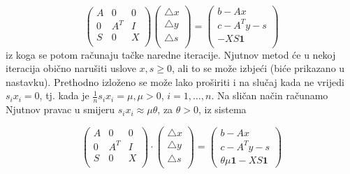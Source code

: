 \documentclass[a4paper, utf8, 11pt, colorlinks]{book}
\begin{document}
\begin{equation}
	\begin{pmatrix}
		A   & 0      &  0      \\
		0   & A^T    &  I      \\
		S   & 0      & X       \\
	\end{pmatrix}  
	\begin{pmatrix} 
		\bigtriangleup  x  \\
		\bigtriangleup  y  \\
		\bigtriangleup  s  \\
	\end{pmatrix} 
	= 
	\begin{pmatrix} 
		b - Ax             \\
		c - A^T y - s      \\
		- X S \textbf{1}  \\                   
	\end{pmatrix} 
\end{equation}
iz koga se potom računaju tačke naredne  iteracije. 
Njutnov metod će u nekoj iteracija obično narušiti uslove $x,s \geq 0$, ali to se može izbjeći (biće prikazano u nastavku).  
Prethodno izloženo se može lako proširiti i na slučaj kada ne vrijedi $s_ix_i = 0$, tj. kada je $\frac{1}{n}s_ix_i = \mu, \mu > 0$, $i=1,\ldots,n$. Na sličan način računamo Njutnov pravac u smijeru $s_i x_i \approx \mu \theta$, za  $\theta >0$, iz sistema 

\begin{equation} \label{eq:newton-interior-system-k}    
	\begin{pmatrix}
		A   & 0      &  0      \\
		0   & A^T    &  I      \\
		S   & 0      & X       \\
	\end{pmatrix} 
	\cdot 
	\begin{pmatrix}
		\bigtriangleup  x  \\
		\bigtriangleup  y  \\
		\bigtriangleup  s  \\
	\end{pmatrix} 
	=
	\begin{pmatrix}
		b - Ax           \\
		c - A^T y - s      \\
		\theta \mu \mathbf{1} - X S \textbf{1}                      
	\end{pmatrix}
\end{equation}
\end{document}
